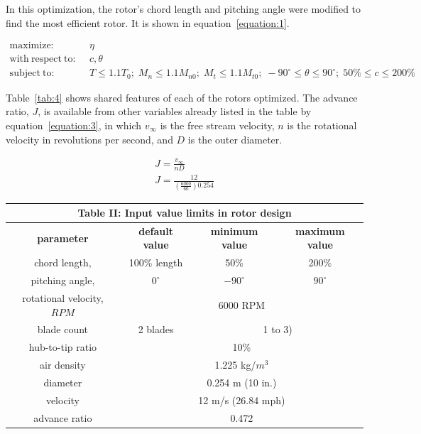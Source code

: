 \documentclass[journal ]{new-aiaa}
\begin{document}
In this optimization, the rotor's chord length and pitching angle were modified to find the most efficient rotor. It is shown in equation~\eqref{equation:1}. 

\begin{equation}
	\label{equation:1}
	\begin{aligned}
		\mathrm{maximize:}& ~~ \eta \\
		\mathrm{with~respect~to:}& ~~ c, \theta \\
		\mathrm{subject~to:}& ~~ T \leq 1.1 T_{0};\; M_{n} \leq 1.1 M_{n0};\; M_{t} \leq 1.1 M_{t0};\; -90^{\circ} \leq \theta \leq 90^{\circ};\; 50\% \leq c \leq 200\%
	\end{aligned}
\end{equation}

Table~\eqref{tab:4} shows shared features of each of the rotors optimized. The advance ratio, $J$, is available from other variables already listed in the table by equation~\eqref{equation:3}, in which $v_{\infty}$ is the free stream velocity, $n$ is the rotational velocity in revolutions per second, and $D$ is the outer diameter.

\begin{equation}
	\begin{aligned}
	\label{equation:3}
	J = \frac{v_{\infty}}{n D} \\
	J = \frac{12}{(\frac{6000}{60}) 0.254}
	\end{aligned}
\end{equation}

\begin{center}
\begin{tabular}{| c | c | c | c |}
	\multicolumn{4}{c}{Table II: Input value limits in rotor design} \\ \hline
  	 \textbf{parameter} & \textbf{default value} & \textbf{minimum value} & \textbf{maximum value} \\ \hline
	 chord length, & 100\% length & 50\% & 200\% \\ \hline
	 pitching angle, & $0^{\circ}$ & $-90^{\circ}$ & $90^{\circ}$ \\ \hline \hline
	 rotational velocity, $RPM$ & \multicolumn{3}{c|}{6000 RPM} \\ \hline
	 blade count & 2 blades & \multicolumn{2}{c|}{1 to 3)}\\ \hline
	 hub-to-tip ratio & \multicolumn{3}{c|}{10\%} \\ \hline
	 air density & \multicolumn{3}{c|}{1.225 kg/$m^{3}$} \\ \hline
	 diameter & \multicolumn{3}{c|}{0.254 m (10 in.)} \\ \hline
	 velocity & \multicolumn{3}{c|}{12 m/s (26.84 mph)} \\ \hline
	 advance ratio & \multicolumn{3}{c|}{0.472} \\ \hline
\end{tabular}
\label{tab:4}
\end{center}
\end{document}
